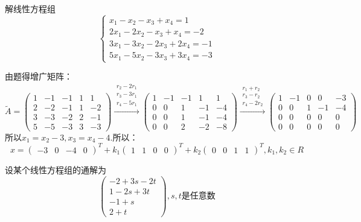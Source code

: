 \documentclass[a4paper]{report}
\begin{document}
\EX 解线性方程组
\begin{equation*}
\begin{cases}
x_1-x_2-x_3+x_4=1\\
2x_1-2x_2-x_3+x_4=-2\\
3x_1-3x_2-2x_3+2x_4=-1\\
5x_1-5x_2-3x_3+3x_4=-3
\end{cases}
\end{equation*}

\begin{jie}
由题得增广矩阵：
\begin{equation*}
\widetilde{A}=
\begin{pmatrix}
1&-1&-1&1&1\\
2&-2&-1&1&-2\\
3&-3&-2&2&-1\\
5&-5&-3&3&-3
\end{pmatrix}
\xrightarrow{\substack{r_2-2r_1\\ r_3-3r_1\\ r_4-5r_1}}{
\begin{pmatrix}
1&-1&-1&1&1\\
0&0&1&-1&-4\\
0&0&1&-1&-4\\
0&0&2&-2&-8
\end{pmatrix}
}
\xrightarrow{\substack{r_1+r_2\\ r_3-r_2\\ r_4-2r_2}}{
\begin{pmatrix}
1&-1&0&0&-3\\
0&0&1&-1&-4\\
0&0&0&0&0\\
0&0&0&0&0
\end{pmatrix}
}
\end{equation*}
所以$x_1=x_2-3,x_3=x_4-4$.所以：
\begin{equation*}
x=
\begin{pmatrix}
-3&0&-4&0
\end{pmatrix}^T+k_{1}
\begin{pmatrix}
1&1&0&0
\end{pmatrix}^T+k_{2}
\begin{pmatrix}
0&0&1&1
\end{pmatrix}^T,k_1,k_2\in R
\end{equation*}
\end{jie}

\EX 设某个线性方程组的通解为
\begin{equation*}
\begin{pmatrix}
-2+3s-2t\\
1-2s+3t\\
-1+s\\
2+t
\end{pmatrix},s,t\text{是任意数}
\end{equation*}
\end{document}

